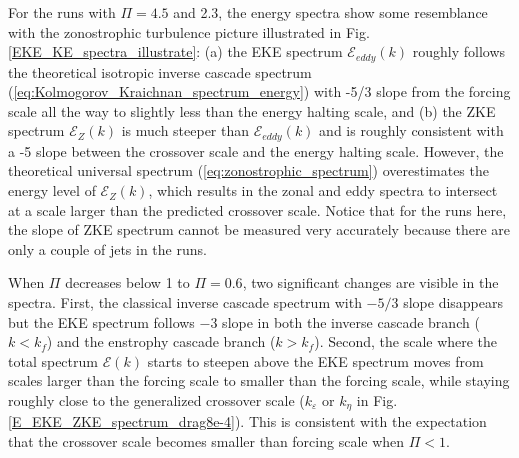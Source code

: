 \documentclass{ametsoc}
\begin{document}
For the runs with $\Pi=4.5$ and 2.3, the energy spectra show some
resemblance with the zonostrophic turbulence picture illustrated in 
Fig. \ref{EKE_KE_spectra_illustrate}: (a) the EKE spectrum $\mathcal{E}_{eddy}(k)$ 
roughly follows the theoretical isotropic inverse cascade spectrum 
(\ref{eq:Kolmogorov_Kraichnan_spectrum_energy}) with -5/3 slope
from the forcing scale all the way to slightly less than the energy
halting scale, and (b) the ZKE spectrum $\mathcal{E}_{Z}(k)$
is much steeper than $\mathcal{E}_{eddy}(k)$ and is roughly consistent with a -5 slope
between the crossover scale and the energy halting scale. However, the theoretical
universal spectrum (\ref{eq:zonostrophic_spectrum}) overestimates 
the energy level of $\mathcal{E}_{Z}(k)$, which results in the zonal
and eddy spectra to intersect at a scale larger than the predicted
crossover scale. Notice that for the runs here, the slope of ZKE spectrum
cannot be measured very accurately because there are only a couple of 
jets in the runs.

When $\Pi$ decreases below 1 to $\Pi=0.6$, two significant changes are 
visible in the spectra. First, the classical inverse cascade spectrum 
with $-5/3$ slope disappears but the EKE spectrum follows $-3$ slope 
in both the inverse cascade branch ($k<k_{f}$) and the  enstrophy cascade branch ($k>k_{f}$). Second, the scale where the total spectrum $\mathcal{E}(k)$ starts to
steepen above the EKE spectrum moves from scales larger than the forcing scale to
smaller than the forcing scale, while staying roughly close to the generalized
crossover scale ($k_\varepsilon$ or $k_\eta$ in Fig. \ref{E_EKE_ZKE_spectrum_drag8e-4}).
This is consistent with the expectation that the crossover scale 
becomes smaller than forcing scale when $\Pi<1$. 
\end{document}
